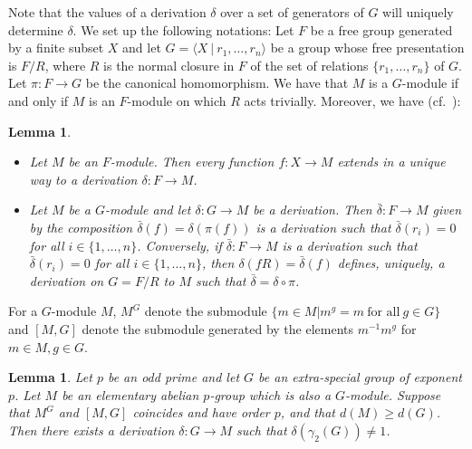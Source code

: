 \documentclass[preprint,sort&compress,12pt]{elsarticle}
\newtheorem{lemma}[theorem]{Lemma}
\theoremstyle{definition}
\numberwithin{equation}{theorem}
\begin{document}
Note that the values of a derivation $\delta$ over a set of generators of $G$ will uniquely determine $\delta$. We set up the following notations: Let $F$ be a free group generated by a finite subset $X$ and let $G=\langle X\ |\ r_1, \dots, r_n\rangle$ be a group whose free presentation is $F/R$, where $R$ is the normal closure in $F$ of the set of relations $\{r_1, \dots, r_n\}$ of $G$. Let $\pi: F\rightarrow G$ be the canonical homomorphism. We have that $M$ is a $G$-module if and only if $M$ is an $F$-module on which $R$ acts trivially. Moreover, we have (cf.\ \cite{GKW}):
\begin{lemma}\label{L:2.1}
\begin{itemize}
\item [$(i)$] Let $M$ be an $F$-module. Then every function $f:X\rightarrow M$ extends in a unique way to a derivation $\delta :F\rightarrow M$.

\item [$(ii)$] Let $M$ be a $G$-module and let $\delta:G\rightarrow M$ be a derivation. Then $\bar{\delta}:F\rightarrow M$ given by the composition $\bar{\delta}(f)= \delta(\pi(f))$ is a derivation such that $\bar{\delta}(r_i)=0$ for all $i\in \{1, \dots, n\}$. Conversely, if $\bar{\delta}:F\rightarrow M$ is a derivation such that $\bar{\delta}(r_i)=0$ for all $i\in \{1, \dots, n\}$, then $\delta(fR)= \bar{\delta}(f)$ defines, uniquely, a derivation on $G=F/R$ to $M$ such that $\bar{\delta}= \delta\circ \pi$.
\end{itemize}
\end{lemma}

For a $G$-module $M$, $M^G$ denote the submodule $\{m\in M| m^g=m\ \text{for\ all}\ g\in G\}$ and $[M, G]$ denote the submodule generated by the elements $m^{-1}m^g$ for $m\in M, g\in G$.
\begin{lemma}\label{L:2.2}
Let $p$ be an odd prime and let $G$ be an extra-special group of exponent $p$. Let $M$ be an elementary abelian $p$-group which is also a $G$-module. Suppose that $M^G$ and $[M, G]$ coincides and have order $p$, and that $d(M)\ge d(G)$. Then there exists a derivation $\delta:G\rightarrow M$ such that $\delta(\gamma_2(G))\neq 1$.
\end{lemma}
\end{document}
